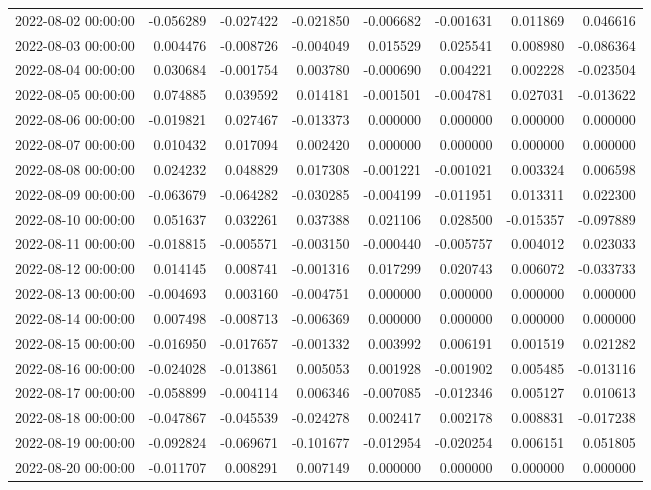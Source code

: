 \begin{tabular}{lrrrrrrr}
2022-08-02 00:00:00 & -0.056289 & -0.027422 & -0.021850 & -0.006682 & -0.001631 & 0.011869 & 0.046616 \\
2022-08-03 00:00:00 & 0.004476 & -0.008726 & -0.004049 & 0.015529 & 0.025541 & 0.008980 & -0.086364 \\
2022-08-04 00:00:00 & 0.030684 & -0.001754 & 0.003780 & -0.000690 & 0.004221 & 0.002228 & -0.023504 \\
2022-08-05 00:00:00 & 0.074885 & 0.039592 & 0.014181 & -0.001501 & -0.004781 & 0.027031 & -0.013622 \\
2022-08-06 00:00:00 & -0.019821 & 0.027467 & -0.013373 & 0.000000 & 0.000000 & 0.000000 & 0.000000 \\
2022-08-07 00:00:00 & 0.010432 & 0.017094 & 0.002420 & 0.000000 & 0.000000 & 0.000000 & 0.000000 \\
2022-08-08 00:00:00 & 0.024232 & 0.048829 & 0.017308 & -0.001221 & -0.001021 & 0.003324 & 0.006598 \\
2022-08-09 00:00:00 & -0.063679 & -0.064282 & -0.030285 & -0.004199 & -0.011951 & 0.013311 & 0.022300 \\
2022-08-10 00:00:00 & 0.051637 & 0.032261 & 0.037388 & 0.021106 & 0.028500 & -0.015357 & -0.097889 \\
2022-08-11 00:00:00 & -0.018815 & -0.005571 & -0.003150 & -0.000440 & -0.005757 & 0.004012 & 0.023033 \\
2022-08-12 00:00:00 & 0.014145 & 0.008741 & -0.001316 & 0.017299 & 0.020743 & 0.006072 & -0.033733 \\
2022-08-13 00:00:00 & -0.004693 & 0.003160 & -0.004751 & 0.000000 & 0.000000 & 0.000000 & 0.000000 \\
2022-08-14 00:00:00 & 0.007498 & -0.008713 & -0.006369 & 0.000000 & 0.000000 & 0.000000 & 0.000000 \\
2022-08-15 00:00:00 & -0.016950 & -0.017657 & -0.001332 & 0.003992 & 0.006191 & 0.001519 & 0.021282 \\
2022-08-16 00:00:00 & -0.024028 & -0.013861 & 0.005053 & 0.001928 & -0.001902 & 0.005485 & -0.013116 \\
2022-08-17 00:00:00 & -0.058899 & -0.004114 & 0.006346 & -0.007085 & -0.012346 & 0.005127 & 0.010613 \\
2022-08-18 00:00:00 & -0.047867 & -0.045539 & -0.024278 & 0.002417 & 0.002178 & 0.008831 & -0.017238 \\
2022-08-19 00:00:00 & -0.092824 & -0.069671 & -0.101677 & -0.012954 & -0.020254 & 0.006151 & 0.051805 \\
2022-08-20 00:00:00 & -0.011707 & 0.008291 & 0.007149 & 0.000000 & 0.000000 & 0.000000 & 0.000000 \\

\end{tabular}
